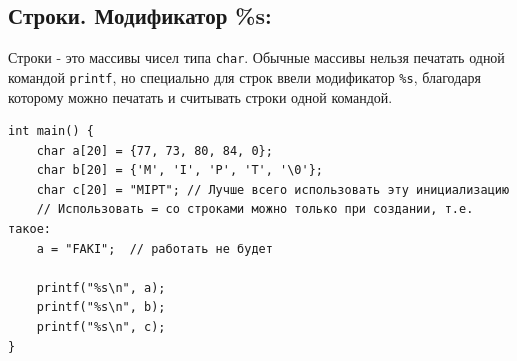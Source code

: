 \documentclass{article}
\begin{document}
\subsection{Строки. Модификатор \%s:}
Строки - это массивы чисел типа \texttt{char}. Обычные массивы нельзя печатать одной командой \texttt{printf}, но специально для строк ввели модификатор \texttt{\%s}, благодаря которому можно печатать и считывать строки одной командой.
\begin{lstlisting}
int main() {
	char a[20] = {77, 73, 80, 84, 0};
	char b[20] = {'M', 'I', 'P', 'T', '\0'};
	char c[20] = "MIPT"; // Лучше всего использовать эту инициализацию
	// Использовать = со строками можно только при создании, т.е. такое:
	a = "FAKI";  // работать не будет
	
	printf("%s\n", a);
	printf("%s\n", b);
	printf("%s\n", c);
}
\end{lstlisting}
\end{document}
